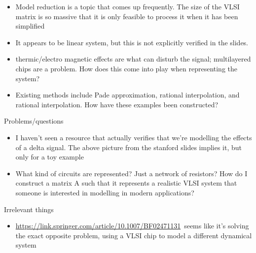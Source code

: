 \documentclass[
]{article}
\providecommand{\tightlist}{%
  \setlength{\itemsep}{0pt}\setlength{\parskip}{0pt}}
\begin{document}
\begin{itemize}
\tightlist
\item
  {Model reduction is a topic that comes up frequently. The size of the
  VLSI matrix is so massive that it is only feasible to process it when
  it has been simplified}
\item
  It appears to be linear system, but this is not explicitly verified
  in the slides.
\item
  thermic/electro magnetic effects are what can disturb the signal;
  multilayered chips are a problem. How does this come into play 
  when representing the system?
\item
  Existing methods include Pade approximation, rational interpolation, 
  and rational interpolation. How have these examples been constructed?
\end{itemize}

{Problems/questions}

\begin{itemize}
\tightlist
\item
  {I haven't seen a resource that actually verifies that we're modelling
  the effects of a delta signal. The above picture from the stanford
  slides implies it, but only for a toy example}
\item
  {What kind of circuits are represented? Just a network of resistors?
  How do I construct a matrix A such that it represents a realistic VLSI
  system that someone is interested in modelling in modern
  applications?}
\end{itemize}

{}

{Irrelevant things}

\begin{itemize}
\tightlist
\item
  {\href{https://www.google.com/url?q=https://link.springer.com/article/10.1007/BF02471131\&sa=D\&ust=1575490230669000}{https://link.springer.com/article/10.1007/BF02471131}}{~seems
  like it's solving the exact opposite problem, using a VLSI chip to
  model a different dynamical system}
\end{itemize}

{}

{}

{}

{}

{}

{}
\end{document}
